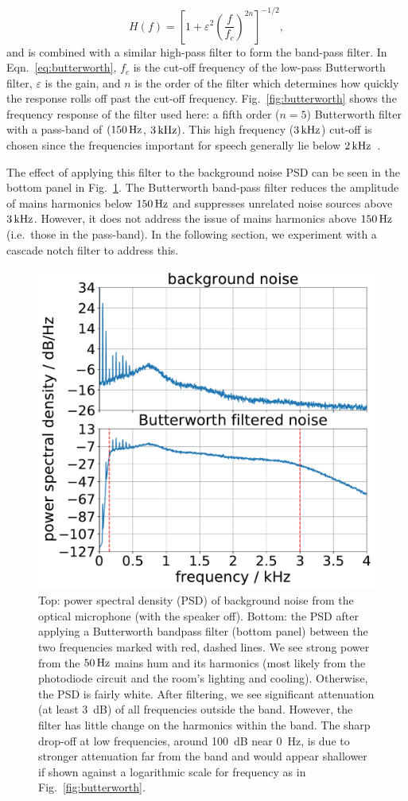 \documentclass[aps,pra,superscriptaddress,reprint]{revtex4-2}
\begin{document}
\begin{equation}
\label{eq:butterworth}
H(f) = \left[1+\varepsilon^2 \left( \frac{f}{f_c} \right)^{2n}\right]^{-1/2},
\end{equation}
and is combined with a similar high-pass filter to form the band-pass filter.
In Eqn.~\ref{eq:butterworth}, $f_c$ is the cut-off frequency of the low-pass Butterworth filter, $\varepsilon$ is the gain, and $n$ is the order of the filter which determines how quickly the response rolls off past the cut-off frequency. Fig.~\ref{fig:butterworth} shows the frequency response of the filter used here: a fifth order ($n = 5$) Butterworth filter with a pass-band of $(150\,{\rm Hz}$, $3\,{\rm kHz})$. This high frequency ($3\,{\rm kHz}$) cut-off is chosen since the frequencies important for speech generally lie below $2\,{\rm kHz}$~\cite{speech_intelligibility}.

The effect of applying this filter to the background noise PSD can be seen in the bottom panel in Fig.~\ref{fig:psd_noise}. The Butterworth band-pass filter reduces the amplitude of mains harmonics below $150\,{\rm Hz}$ and suppresses unrelated noise sources above $3\,{\rm kHz}$. However, it does not address the issue of mains harmonics above $150\,{\rm Hz}$ (i.e.\ those in the pass-band). In the following section, we experiment with a cascade notch filter to address this.

\begin{figure}
	\includegraphics[width=.5\textwidth]{figures/psd_butterworth_14_6.pdf}
	\caption{\label{fig:psd_noise}
Top: power spectral density (PSD) of background noise from the optical microphone (with the speaker off). 
Bottom: the PSD after applying a Butterworth bandpass filter (bottom panel) between the two frequencies marked with red, dashed lines. 
We see strong power from the $50\,{\rm Hz}$ mains hum and its harmonics (most likely from the photodiode circuit and the room’s lighting and cooling). Otherwise, the PSD is fairly white. 
After filtering, we see significant attenuation (at least 3~dB) of all frequencies outside the band.
However, the filter has little change on the harmonics within the band.
The sharp drop-off at low frequencies, around 100~dB near 0~Hz, is due to stronger attenuation far from the band and would appear shallower if shown against a logarithmic scale for frequency as in Fig.~\ref{fig:butterworth}.
}
\end{figure}
\end{document}
